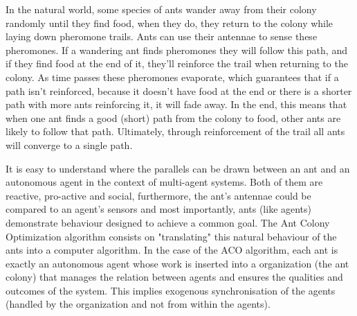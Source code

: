 \documentclass[times, 10pt,twocolumn]{article}
\begin{document}
        In the natural world, some species of ants wander away from their colony randomly until 
    they find food, when they do, they return to the colony while laying down pheromone trails.
    Ants can use their antennae to sense these pheromones. If a wandering ant finds pheromones
    they will follow this path, and if they find food at the end of it, they'll reinforce the 
    trail when returning to the colony. As time passes these pheromones evaporate, which 
    guarantees that if a path isn't reinforced, because it doesn't have food at the end or there
    is a shorter path with more ants reinforcing it, it will fade away. In the end, this 
    means that when one ant finds a good (short) path from the colony to food, other ants are
    likely to follow that path. Ultimately, through reinforcement of the trail all ants will
    converge to a single path.
	
	    It is easy to understand where the parallels can be drawn between an ant and an autonomous 
    agent in the context of multi-agent systems. Both of them are reactive, pro-active and
    social, furthermore, the ant's antennae could be compared to an agent's sensors and 
    most importantly, ants (like agents) demonstrate behaviour designed to achieve a common goal. 
    The Ant Colony Optimization algorithm consists on "translating" this natural behaviour
    of the ants into a computer algorithm. In the case of the ACO algorithm, each ant is 
    exactly an autonomous agent whose work is inserted into a organization (the ant colony) 
    that manages the relation between agents and ensures the qualities and outcomes of the 
    system. This implies exogenous synchronisation of the agents (handled by the organization 
    and not from within the agents).
	

	


	

	 
	
\end{document}
